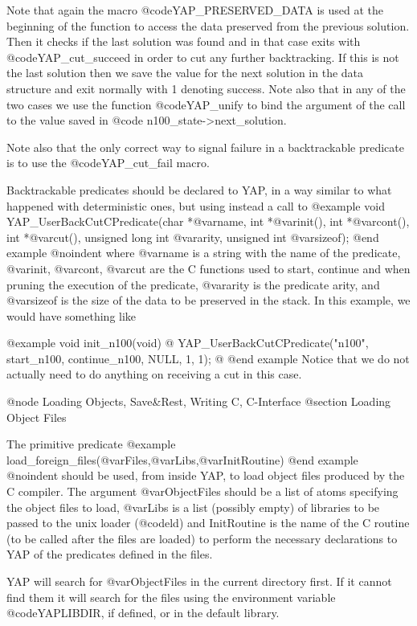 {{{{{{{{{Note that again the macro @code{YAP_PRESERVED_DATA} is used at the
beginning of the function to access the data preserved from the previous
solution.  Then it checks if the last solution was found and in that
case exits with @code{YAP_cut_succeed} in order to cut any further
backtracking.  If this is not the last solution then we save the value
for the next solution in the data structure and exit normally with 1
denoting success. Note also that in any of the two cases we use the
function @code{YAP_unify} to bind the argument of the call to the value
saved in @code{ n100_state->next_solution}.


Note also that the only correct way to signal failure in a backtrackable
predicate is to use the @code{YAP_cut_fail} macro.

Backtrackable predicates should be declared to YAP, in a way
similar to what happened with deterministic ones, but using instead a
call to
@example
      void YAP_UserBackCutCPredicate(char *@var{name},
                 int *@var{init}(), int *@var{cont}(), int *@var{cut}(),
                 unsigned long int @var{arity}, unsigned int @var{sizeof});
@end example
@noindent
where @var{name} is a string with the name of the predicate, @var{init},
@var{cont}, @var{cut} are the C functions used to start, continue and
when pruning the execution of the predicate, @var{arity} is the
predicate arity, and @var{sizeof} is the size of the data to be
preserved in the stack. In this example, we would have something like

@example
void
init_n100(void)
@{
  YAP_UserBackCutCPredicate("n100", start_n100, continue_n100, NULL, 1, 1);
@}
@end example
Notice that we do not actually need to do anything on receiving a cut in
this case.

@node Loading Objects, Save&Rest, Writing C, C-Interface
@section Loading Object Files

The primitive predicate
@example
      load_foreign_files(@var{Files},@var{Libs},@var{InitRoutine})
@end example
@noindent
should be used, from inside YAP, to load object files produced by the C
compiler. The argument @var{ObjectFiles} should be a list of atoms
specifying the object files to load, @var{Libs} is a list (possibly
empty) of libraries to be passed to the unix loader (@code{ld}) and
InitRoutine is the name of the C routine (to be called after the files
are loaded) to perform the necessary declarations to YAP of the
predicates defined in the files. 

YAP will search for @var{ObjectFiles} in the current directory first. If
it cannot find them it will search for the files using the environment
variable @code{YAPLIBDIR}, if defined, or in the default library.

}}}}}}}}}
